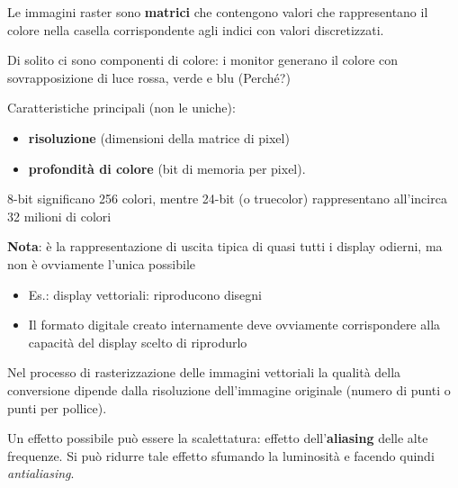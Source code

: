 \documentclass[a4paper, 10pt]{article}
\begin{document}
		\noindent
		Le immagini raster sono \textbf{matrici} che contengono valori che rappresentano il colore
		nella casella corrispondente agli indici con valori discretizzati.
		
		\noindent
		Di solito ci sono componenti di colore: i monitor generano il colore
		con sovrapposizione di luce rossa, verde e blu (Perché?)
		
		\noindent
		Caratteristiche principali (non le uniche): 
		\begin{itemize}
			\item \textbf{risoluzione} (dimensioni della matrice di pixel)
			\item \textbf{profondità di colore} (bit di memoria per pixel).
		\end{itemize}
		8-bit significano 256 colori, mentre 24-bit (o truecolor)
		rappresentano all’incirca 32 milioni di colori
		
		\noindent
		\textbf{Nota}: è la rappresentazione di uscita tipica di quasi tutti i
		display odierni, ma non è ovviamente l'unica possibile
		\begin{itemize}
			\item Es.: display vettoriali: riproducono disegni
			\item Il formato digitale creato internamente deve ovviamente
			corrispondere alla capacità del display scelto di riprodurlo
		\end{itemize}
		
		Nel processo di rasterizzazione delle immagini vettoriali la qualità della
		conversione dipende	dalla risoluzione dell'immagine originale (numero di punti o punti per pollice).
		
		\noindent
		Un effetto possibile può essere la scalettatura: effetto dell'\textbf{aliasing} delle alte frequenze.
		Si può ridurre tale effetto sfumando la luminosità e facendo quindi \textit{antialiasing}.
		
\end{document}
